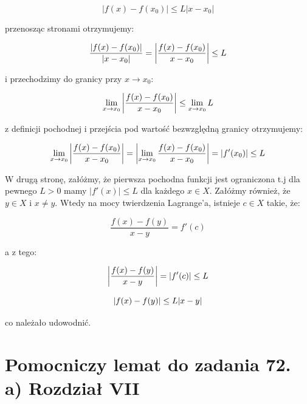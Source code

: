 \documentclass{article}
\begin{document}
\begin{equation*}
    |f(x) - f(x_0)| \leq L|x-x_0|
\end{equation*}

przenosząc stronami otrzymujemy:

\begin{equation*}
    \frac{|f(x) - f(x_0)|}{|x-x_0|} = \abs{\frac{f(x) - f(x_0)}{x-x_0}} \leq L
\end{equation*}

i przechodzimy do granicy przy \(x \to x_0\):

\begin{equation*}
    \lim_{x \to x_0} \abs{\frac{f(x) - f(x_0)}{x-x_0}} \leq  \lim_{x \to x_0} L 
\end{equation*}

z definicji pochodnej i przejścia pod wartość bezwzględną granicy otrzymujemy:

\begin{equation*}
    \lim_{x \to x_0} \abs{\frac{f(x) - f(x_0)}{x-x_0}} = \abs{\lim_{x \to x_0} \frac{f(x) - f(x_0)}{x-x_0}} = \abs{f'(x_0)} \leq L
\end{equation*}

W drugą stronę, załóżmy, że pierwsza pochodna funkcji jest ograniczona t.j dla pewnego \(L > 0\)
mamy \(|f'(x)| \leq L\) dla każdego \(x \in X\). Załóżmy również, że \(y \in X\) i \(x \neq y\).
Wtedy na mocy twierdzenia Lagrange'a, istnieje \(c \in X\) takie, że:

\begin{equation*}
    \frac{f(x) - f(y)}{x - y} = f'(c)
\end{equation*}

a z tego:

\begin{equation*}
    \abs{\frac{f(x) - f(y)}{x - y}} = \abs{f'(c)} \leq L
\end{equation*}

\begin{equation*}
    \abs{f(x) - f(y)} \leq L|x - y|
\end{equation*}

co należało udowodnić.

\section{Pomocniczy lemat do zadania 72. a) Rozdział VII}
\end{document}
